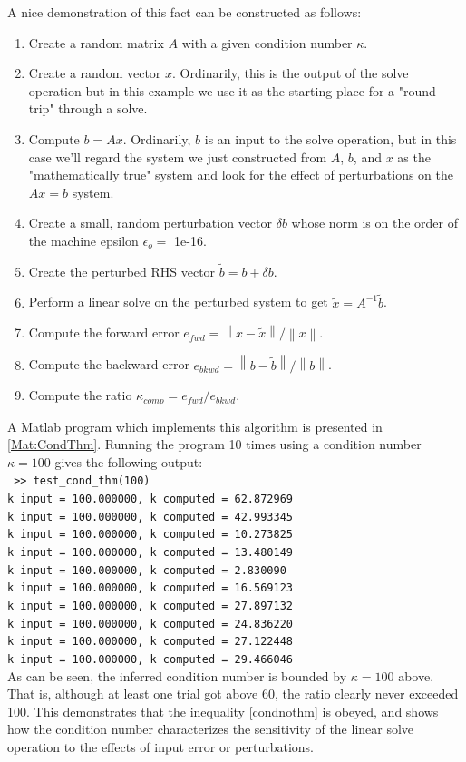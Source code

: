 \documentclass[onefignum,onetabnum]{siamart190516}
\begin{document}
A nice demonstration of this fact can be constructed as follows:
\begin{enumerate}
	\item Create a random matrix $A$ with a given condition number $\kappa$.
	\item Create a random vector $x$.  Ordinarily, this is the output of the solve operation but
	in this example we use it as the starting place for a "round trip" through a solve.
	\item Compute $b = A x$.  Ordinarily, $b$ is an input to the solve operation, but in this case we'll regard
	the system we just constructed from $A$, $b$, and $x$ as the "mathematically true" system and look for the
	effect of perturbations on the $A x = b$ system.
	\item Create a small, random perturbation vector $\delta b$ whose norm is on the order of the machine epsilon $\epsilon_o = $ 1e-16.
	\item Create the perturbed RHS vector $\tilde{b} = b + \delta b$.
	\item Perform a linear solve on the perturbed system to get $\tilde{x} = A^{-1} \tilde{b}$.
	\item Compute the forward error $e_{fwd} = {\left\lVert x - \tilde{x} \right\rVert}/{\left\lVert x \right\rVert}$.
	\item Compute the backward error $e_{bkwd} = {\left\lVert b - \tilde{b} \right\rVert}/{\left\lVert b \right\rVert}$.
	\item Compute the ratio $\kappa_{comp} = e_{fwd}/e_{bkwd}$.	
\end{enumerate}
A Matlab program which implements this algorithm is presented in \cref{Mat:CondThm}.  Running the program 10 times using
a condition number $\kappa = 100$ gives the following output: \\
\texttt{
\indent >> test\_cond\_thm(100) \\
\indent k input = 100.000000, k computed = 62.872969 \\
\indent k input = 100.000000, k computed = 42.993345 \\
\indent k input = 100.000000, k computed = 10.273825 \\
\indent k input = 100.000000, k computed = 13.480149 \\
\indent k input = 100.000000, k computed = 2.830090 \\
\indent k input = 100.000000, k computed = 16.569123 \\
\indent k input = 100.000000, k computed = 27.897132 \\
\indent k input = 100.000000, k computed = 24.836220 \\
\indent k input = 100.000000, k computed = 27.122448 \\
\indent k input = 100.000000, k computed = 29.466046 \\
}
As can be seen, the inferred condition number is bounded by $\kappa = 100$ above.
That is, although at least one trial got above 60, the ratio clearly never exceeded 100.  This demonstrates that the inequality
\cref{condnothm} is obeyed, and shows 
how the condition number characterizes the sensitivity of the linear solve
operation to the effects of input error or perturbations.
\end{document}
